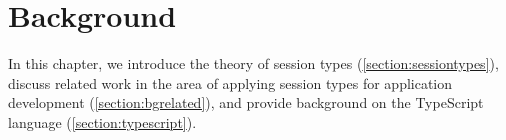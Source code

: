 \chapter{Background}
\label{chap:background}

In this chapter,
we introduce the theory
of session types
(\cref{section:sessiontypes}),
discuss related work
in the area of applying
session types for application development
(\cref{section:bgrelated}),
and provide background on the TypeScript language
(\cref{section:typescript}).

%






